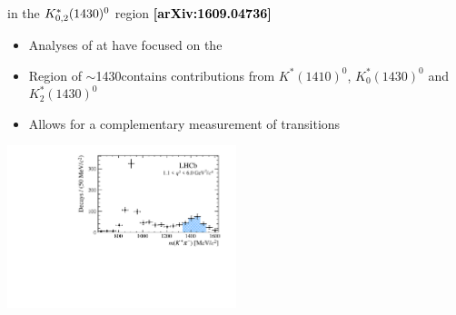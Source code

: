 \documentclass[aspectratio=1610]{beamer}
\def\Kstarfourteenthirty  {{\ensuremath{\kaon^{*}_{0,2}(1430)^{0}}}\xspace}
\begin{document}
\begin{frame}{\BdToKpimm in the \Kstarfourteenthirty region \hspace{0pt plus 1 filll} {\small \bf \textcolor{black}{[arXiv:1609.04736]}}}
\begin{itemize}
\item Analyses of \BdToKpimm at \lhcb have focused on the \KstP
\item Region of \mkpi $\sim$1430\mevcc contains contributions from $K^\ast(1410)^0$, $K^\ast_0(1430)^0$ and $K^\ast_2(1430)^0$
\item Allows for a complementary measurement of \btosll transitions
\end{itemize}

\bigskip
\centering
\includegraphics[width=0.5\textwidth]{figs/kpimm/introduction/full-mkpi.pdf}
\end{frame}
\end{document}
